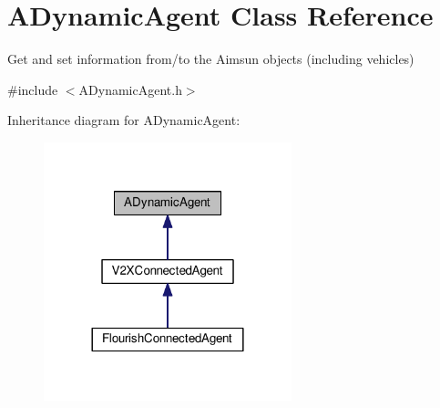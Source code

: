 \hypertarget{classADynamicAgent}{}\section{A\+Dynamic\+Agent Class Reference}
\label{classADynamicAgent}


Get and set information from/to the Aimsun objects (including vehicles)  




{\ttfamily \#include $<$A\+Dynamic\+Agent.\+h$>$}



Inheritance diagram for A\+Dynamic\+Agent\+:\nopagebreak
\begin{figure}[H]
\begin{center}
\leavevmode
\includegraphics[width=204pt]{classADynamicAgent__inherit__graph}
\end{center}
\end{figure}

